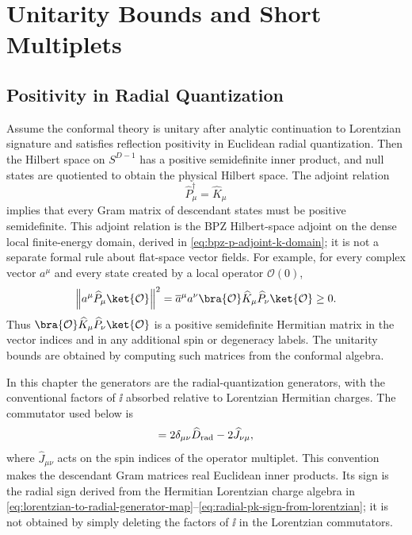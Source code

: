 \chapter{Unitarity Bounds and Short Multiplets}
\label{ch:volume-iii-unitarity-bounds-short-multiplets}
\ConventionsMixedCFT


\section{Positivity in Radial Quantization}

Assume the conformal theory is unitary after analytic continuation to
Lorentzian signature and satisfies reflection positivity in Euclidean radial
quantization.  Then the Hilbert space on \(S^{D-1}\) has a positive
semidefinite inner product, and null states are quotiented to obtain the
physical Hilbert space.  The adjoint relation
\[
  \widehat P_\mu^\dagger=\widehat K_\mu
\]
implies that every Gram matrix of descendant states must be positive
semidefinite.  This adjoint relation is the BPZ Hilbert-space adjoint on the
dense local finite-energy domain, derived in
\eqref{eq:bpz-p-adjoint-k-domain}; it is not a separate formal rule about
flat-space vector fields.
For example, for every complex vector \(a^\mu\) and every state created by a
local operator \(\mathcal O(0)\),
\begin{equation}
  \left\|
    a^\mu\widehat P_\mu\ket{\mathcal O}
  \right\|^2
  =
  \overline a^\mu a^\nu
  \bra{\mathcal O}\widehat K_\mu\widehat P_\nu\ket{\mathcal O}
  \ge0.
  \label{eq:first-descendant-positivity-basic}
\end{equation}
Thus \(\bra{\mathcal O}\widehat K_\mu\widehat P_\nu\ket{\mathcal O}\) is a
positive semidefinite Hermitian matrix in the vector indices and in any
additional spin or degeneracy labels.  The unitarity bounds are obtained by
computing such matrices from the conformal algebra.

In this chapter the generators are the radial-quantization generators, with
the conventional factors of \(\ii\) absorbed relative to Lorentzian Hermitian
charges.  The commutator used below is
\begin{equation}
  [\widehat K_\mu,\widehat P_\nu]
  =
  2\delta_{\mu\nu}\widehat D_{\rm rad}-2\widehat J_{\nu\mu},
  \label{eq:radial-pk-commutator}
\end{equation}
where \(\widehat J_{\mu\nu}\) acts on the spin indices of the operator
multiplet.  This convention makes the descendant Gram matrices real
Euclidean inner products.  Its sign is the radial sign derived from the
Hermitian Lorentzian charge algebra in
\eqref{eq:lorentzian-to-radial-generator-map}--\eqref{eq:radial-pk-sign-from-lorentzian};
it is not obtained by simply deleting the factors of \(\ii\) in the
Lorentzian commutators.

